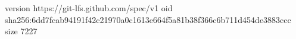 version https://git-lfs.github.com/spec/v1
oid sha256:6dd7fcab94191f42c21970a0c1613e664f5a81b38f366c6b711d454de3883ccc
size 7227
